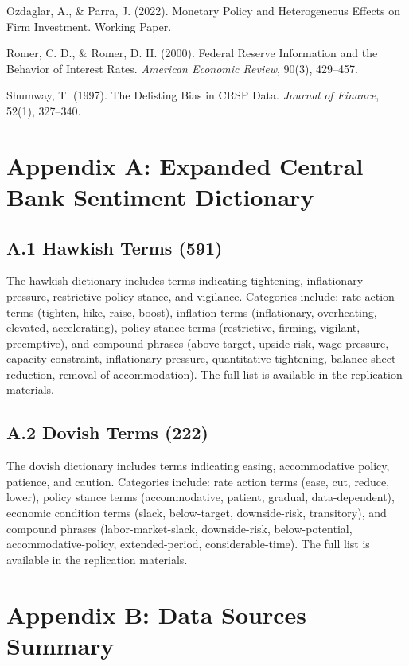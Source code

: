 \documentclass[12pt]{article}
\begin{document}
Ozdaglar, A., \& Parra, J. (2022). Monetary Policy and Heterogeneous Effects on Firm Investment. Working Paper.

Romer, C. D., \& Romer, D. H. (2000). Federal Reserve Information and the Behavior of Interest Rates. \textit{American Economic Review}, 90(3), 429--457.

Shumway, T. (1997). The Delisting Bias in CRSP Data. \textit{Journal of Finance}, 52(1), 327--340.


\section{Appendix A: Expanded Central Bank Sentiment Dictionary}

\subsection{A.1 Hawkish Terms (591)}

The hawkish dictionary includes terms indicating tightening, inflationary pressure, restrictive policy stance, and vigilance. Categories include: rate action terms (tighten, hike, raise, boost), inflation terms (inflationary, overheating, elevated, accelerating), policy stance terms (restrictive, firming, vigilant, preemptive), and compound phrases (above-target, upside-risk, wage-pressure, capacity-constraint, inflationary-pressure, quantitative-tightening, balance-sheet-reduction, removal-of-accommodation). The full list is available in the replication materials.

\subsection{A.2 Dovish Terms (222)}

The dovish dictionary includes terms indicating easing, accommodative policy, patience, and caution. Categories include: rate action terms (ease, cut, reduce, lower), policy stance terms (accommodative, patient, gradual, data-dependent), economic condition terms (slack, below-target, downside-risk, transitory), and compound phrases (labor-market-slack, downside-risk, below-potential, accommodative-policy, extended-period, considerable-time). The full list is available in the replication materials.


\section{Appendix B: Data Sources Summary}
\end{document}
